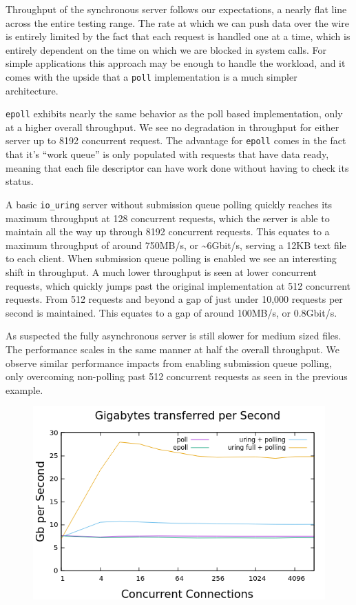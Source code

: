 \documentclass[letterpaper, 10pt, twocolumn]{article}
\begin{document}
Throughput of the synchronous server follows our expectations, a nearly flat line across the entire testing range. The rate at which we can push data over the wire is entirely limited by the fact that each request is handled one at a time, which is entirely dependent on the time on which we are blocked in system calls. For simple applications this approach may be enough to handle the workload, and it comes with the upside that a \texttt{poll} implementation is a much simpler architecture.

\texttt{epoll} exhibits nearly the same behavior as the poll based implementation, only at a higher overall throughput. We see no degradation in throughput for either server up to 8192 concurrent request. The advantage for \texttt{epoll} comes in the fact that it's ``work queue'' is only populated with requests that have data ready, meaning that each file descriptor can have work done without having to check its status.

A basic \texttt{io\_uring} server without submission queue polling quickly reaches its maximum throughput at 128 concurrent requests, which the server is able to maintain all the way up through 8192 concurrent requests. This equates to a maximum throughput of around 750MB/s, or \textasciitilde{}6Gbit/s, serving a 12KB text file to each client. When submission queue polling is enabled we see an interesting shift in throughput. A much lower throughput is seen at lower concurrent requests, which quickly jumps past the original implementation at 512 concurrent requests. From 512 requests and beyond a gap of just under 10,000 requests per second is maintained. This equates to a gap of around 100MB/s, or 0.8Gbit/s.

As suspected the fully asynchronous server is still slower for medium sized files. The performance scales in the same manner at half the overall throughput. We observe similar performance impacts from enabling submission queue polling, only overcoming non-polling past 512 concurrent requests as seen in the previous example.

\begin{figure}
\centering
\includegraphics[width=4.5in]{gbps.png}
\end{figure}
\end{document}
